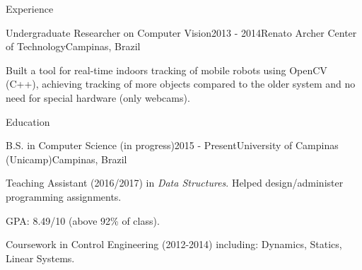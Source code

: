\documentclass[8pt]{resume}
\newcommand{\tit}[1]{\textit{#1}}
\begin{document}
\begin{rSection}{Experience}
\begin{rSubsection}{Undergraduate Researcher on Computer Vision}{2013 - 2014}{Renato Archer Center of Technology}{Campinas, Brazil}
    \item Built a tool for real-time indoors tracking of
        mobile robots using OpenCV (C++),
        achieving tracking of more objects compared to the older system
        and no need for special hardware (only webcams).
\end{rSubsection}

\end{rSection}

\begin{rSection}{Education}

    \begin{rSubsection}{B.S. in Computer Science (in progress)}{2015 - Present}{University of Campinas (Unicamp)}{Campinas, Brazil}
    \item Teaching Assistant (2016/2017) in \tit{Data Structures}. Helped
        design/administer programming assignments.
    \item GPA: 8.49/10 (above 92\% of class).
    \item Coursework in Control Engineering (2012-2014) including:
        Dynamics, Statics, Linear Systems.
\end{rSubsection}

\end{rSection}
\end{document}
